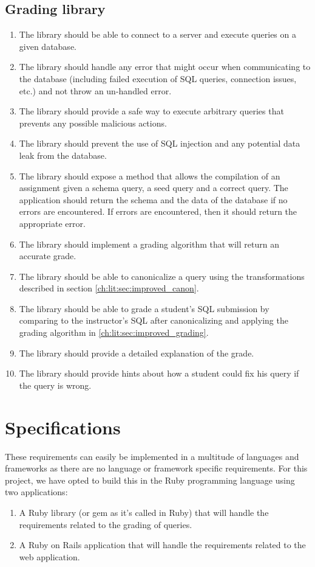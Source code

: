 \subsection{Grading library}
\begin{enumerate}[label=G-\arabic*]
  \item The library should be able to connect to a  server and execute queries on a given database.
  \item The library should handle any error that might occur when communicating to the database (including failed execution of SQL queries, connection issues, etc.) and not throw an un-handled error.
  \item The library should provide a safe way to execute arbitrary queries that prevents any possible malicious actions.
  \item The library should prevent the use of SQL injection and any potential data leak from the database.
  \item The library should expose a method that allows the compilation of an assignment given a schema query, a seed query and a correct query. The application should return the schema and the data of the database if no errors are encountered. If errors are encountered, then it should return the appropriate error.
  \item The library should implement a grading algorithm that will return an accurate grade.
  \item The library should be able to canonicalize a query using the transformations described in section \ref{ch:lit:sec:improved_canon}.
  \item The library should be able to grade a student's SQL submission by comparing to the instructor's SQL after canonicalizing and applying the grading algorithm in \ref{ch:lit:sec:improved_grading}.
  \item The library should provide a detailed explanation of the grade.
  \item The library should provide hints about how a student could fix his query if the query is wrong.
\end{enumerate}

\section{Specifications} \label{ch:reqandspec:sec:spec}

These requirements can easily be implemented in a multitude of languages and frameworks as there are no language or framework specific requirements. For this project, we have opted to build this in the Ruby programming language using two applications:
\begin{enumerate}
    \item A Ruby library (or gem as it's called in Ruby) that will handle the requirements related to the grading of queries.
    \item A Ruby on Rails application that will handle the requirements related to the web application.
\end{enumerate}

